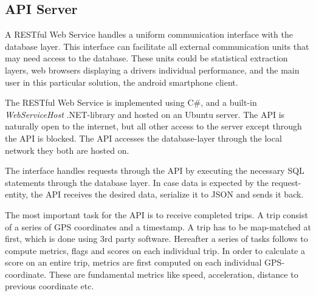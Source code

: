 \subsection{API Server}\label{subsec:api}
A RESTful Web Service handles a uniform communication interface with the database layer. This interface can facilitate all external communication units that may need access to the database. These units could be statistical extraction layers, web browsers displaying a drivers individual performance, and the main user in this particular solution, the android smartphone client. 

The RESTful Web Service is implemented using C\#, and a built-in \textit{WebServiceHost} .NET-library and hosted on an Ubuntu server. The API is naturally open to the internet, but all other access to the server except through the API is blocked. The API accesses the database-layer through the local network they both are hosted on.

The interface handles requests through the API by executing the necessary SQL statements through the database layer. In case data is expected by the request-entity, the API receives the desired data, serialize it to JSON and sends it back.

The most important task for the API is to receive completed trips. A trip consist of a series of GPS coordinates and a timestamp. A trip has to be map-matched at first, which is done using 3rd party software\cite{trackmatch}. Hereafter a series of tasks follows to compute metrics, flags and scores on each individual trip\cite{sw9_report}. In order to calculate a score on an entire trip, metrics are first computed on each individual GPS-coordinate. These are fundamental metrics like speed, acceleration, distance to previous coordinate etc. 

